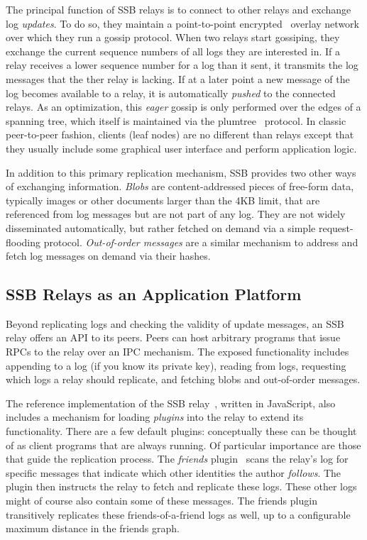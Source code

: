\documentclass[9pt,sigconf]{acmart}
\begin{document}
The principal function of SSB relays is to connect to other relays and exchange log {\em updates}. To do so, they maintain a point-to-point encrypted~\cite{tarr2015secrethandshake} overlay network over which they run a gossip protocol. When two relays start gossiping, they exchange the current sequence numbers of all logs they are interested in. If a relay receives a lower sequence number for a log than it sent, it transmits the log messages that the ther relay is lacking. If at a later point a new message of the log becomes available to a relay, it is automatically \textit{pushed} to the connected relays. As an optimization, this {\em eager} gossip is only performed over the edges of a spanning tree, which itself is maintained via the plumtree~\cite{leitao2007epidemic} protocol. In classic peer-to-peer fashion, clients (leaf nodes) are no different than relays except that they usually include some graphical user interface and perform application logic.

In addition to this primary replication mechanism, SSB provides two other ways of exchanging information. {\em Blobs} are content-addressed pieces of free-form data, typically images or other documents larger than the 4KB limit, that are referenced from log messages but are not part of any log. They are not widely disseminated automatically, but rather fetched on demand via a simple request-flooding protocol. {\em Out-of-order messages} are a similar mechanism to address and fetch log messages on demand via their hashes.

\subsection*{SSB Relays as an Application Platform}

Beyond replicating logs and checking the validity of update messages, an SSB relay offers an API to its peers. Peers can host arbitrary programs that issue RPCs to the relay over an IPC mechanism. The exposed functionality includes appending to a log (if you know its private key), reading from logs, requesting which logs a relay should replicate, and fetching blobs and out-of-order messages.

The reference implementation of the SSB relay~\cite{ssb-server}, written in JavaScript, also includes a mechanism for loading {\em plugins} into the relay to extend its functionality. There are a few default plugins: conceptually these can be thought of as client programs that are always running. Of particular importance are those that guide the replication process. The {\em friends} plugin~\cite{ssb-friends} scans the relay's log for specific messages that indicate which other identities the author {\em follows}. The plugin then instructs the relay to fetch and replicate these logs. These other logs might of course also contain some of these messages. The friends plugin transitively replicates these friends-of-a-friend logs as well, up to a configurable maximum distance in the friends graph.
\end{document}
